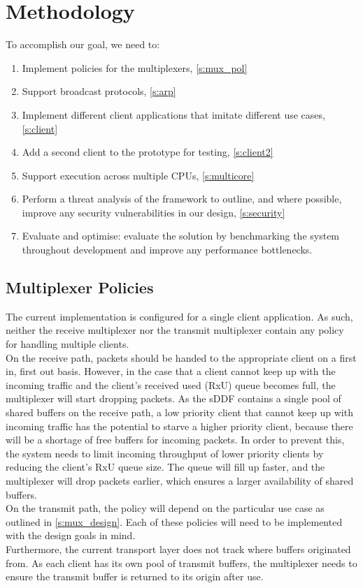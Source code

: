 \section{Methodology}
To accomplish our goal, we need to:
\begin{enumerate}
    \item Implement policies for the multiplexers, \autoref{s:mux_pol}
    \item Support broadcast protocols, \autoref{s:arp}
    \item Implement different client applications that imitate different use cases, \autoref{s:client}
    \item Add a second client to the prototype for testing, \autoref{s:client2}
    \item Support execution across multiple CPUs, \autoref{s:multicore}
    \item Perform a threat analysis of the framework to outline, and where possible, improve any
         security vulnerabilities in our design, \autoref{s:security}
    \item Evaluate and optimise: evaluate the solution by benchmarking the system throughout development 
    and improve any performance bottlenecks.
\end{enumerate}

\subsection{Multiplexer Policies} \label{s:mux_pol}
The current implementation is configured for a single client application. As such, neither the receive multiplexer
nor the transmit multiplexer contain any policy for handling multiple clients.\\
On the receive path, packets should be handed to the appropriate client on a first in, first out basis. However, 
in the case that a client cannot keep up with the incoming traffic and the client's received used (RxU) queue becomes full,
the multiplexer will start dropping packets. As the sDDF contains a single pool of shared buffers on the receive path,
a low priority client that cannot keep up with incoming traffic has the potential to starve a higher priority client, 
because there will be a shortage of free buffers for incoming packets. In order to prevent this, the system needs
to limit incoming throughput of lower priority clients by reducing the client's RxU queue size. The queue will 
fill up faster, and the multiplexer will drop packets earlier, which ensures a larger availability of shared buffers.\\
On the transmit path, the policy will depend on the particular use case as outlined in \autoref{s:mux_design}. Each of these
policies will need to be implemented with the design goals in mind.\\
Furthermore, the current transport layer does not track where buffers originated from. As each client has its own
pool of transmit buffers, the multiplexer needs to ensure the transmit buffer is returned to its origin after use.

